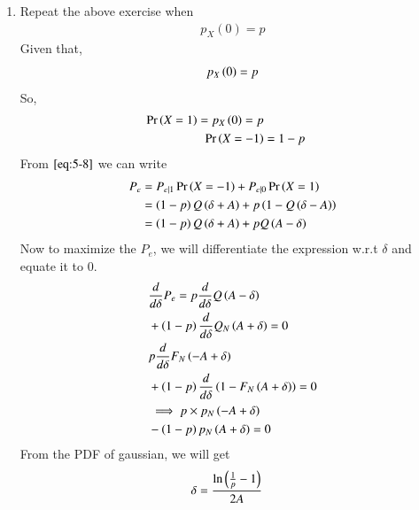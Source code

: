 \documentclass[journal,12pt,twocolumn]{IEEEtran}
\renewcommand\thesection{\arabic{section}}
\begin{document}
\begin{enumerate}[label=\thesection.\arabic*
,ref=\thesection.\theenumi]
\begin{enumerate}[label=\thesection.\arabic*
,ref=\thesection.\theenumi]
\begin{align}
	    - \frac{\brak{\delta - A}^2}{2} &= -\frac{\brak{\delta + A}^2}{2}\\
		  \brak{\delta - A}^2 &= \brak{\delta + A}^2\\
		  \delta &= 0 
     \end{align}
    Now we will find whether $P_e$ attains maxima or minima at $\delta = 0$
     \begin{align}
	     \frac{d^2P_e}{d\delta^{2}}|_{\delta = 0} &= 2A\exp\brak{\frac{-A^{2}}{2}} > 0
     \end{align}
\item Repeat the above exercise when
	\begin{align}
		p_{X}(0) = p
	\end{align}
 \solution Given that,
         \begin{align}
		 p_{X}\left(0\right) = p
         \end{align}
	 So,
	 \begin{align}
           \Pr\left(X = 1\right) = p_{X}\left(0\right) = p\\
           \Pr\left(X = -1\right) &= 1 - p
         \end{align}		 
   From $\eqref{eq:5-8}$ we can write
         \begin{align}
             P_e &= P_{e|1}\Pr\left(X = -1\right) + P_{e|0}\Pr\left(X=1\right) \\
		 &= \left(1-p\right)Q\left(\delta + A\right) + p\left(1 - Q\left(\delta - A\right)\right)\\
		 &= \left(1-p\right)Q\left(\delta + A\right) + pQ\left(A - \delta\right)
         \end{align}
   Now to maximize the $P_e$, we will differentiate the expression w.r.t $\delta$ and equate it to $0$.
         \begin{align}
          &\frac{d}{d\delta}P_e=p\frac{d}{d\delta} Q\left(A -\delta\right)\nonumber \\
          &+\left(1-p\right)\frac{d}{d\delta} Q_N\left(A+\delta\right)=0\\
          &p\frac{d}{d\delta} F_N\left(-A+\delta\right)\nonumber \\
          &+\left(1-p\right)\frac{d}{d\delta}\left(1-F_N\left(A+\delta\right)\right)=0\\
          &\implies p\times p_N\left(-A+\delta\right)\\
          &-\left(1-p\right)p_N\left(A+\delta\right)=0
         \end{align}     
  From the PDF of gaussian, we will get
         \begin{align}
		 \delta &= \frac{\ln\left(\frac{1}{p} - 1\right)}{2A}
         \end{align}

\end{enumerate}
\end{enumerate}
\end{document}
